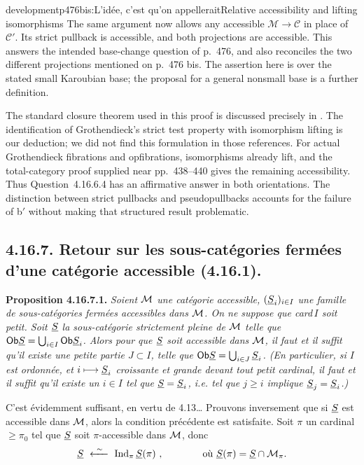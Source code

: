 \begin{dcomment}{development}{p476bis:L'idée, c'est qu'on appellerait}{Relative accessibility and lifting isomorphisms}
The same argument now allows any accessible $\mathcal M\to\mathcal C$ in place of $\mathcal C'$. Its strict pullback is accessible, and both projections are accessible. This answers the intended base-change question of p.~476, and also reconciles the two different projections mentioned on p.~476 bis. The assertion here is over the stated small Karoubian base; the proposal for a general nonsmall base is a further definition.

The standard closure theorem used in this proof is discussed precisely in \citet[Examples~4.8 and Remark~4.9]{BourkeLack2024}. The identification of Grothendieck's strict test property with isomorphism lifting is our deduction; we did not find this formulation in those references. For actual Grothendieck fibrations and opfibrations, isomorphisms already lift, and the total-category proof supplied near pp.~438--440 gives the remaining accessibility. Thus Question~4.16.6.4 has an affirmative answer in both orientations. The distinction between strict pullbacks and pseudopullbacks accounts for the failure of b$'$ without making that structured result problematic.
\end{dcomment}


\subsection*{4.16.7. Retour sur les sous-catégories fermées d'une catégorie accessible (4.16.1).}

\textbf{Proposition 4.16.7.1.} \textit{Soient $\mathcal{M}$ une catégorie accessible, $(\underline{S}_i)_{i\in I}$ une famille de sous-catégories fermées accessibles dans $\mathcal{M}$. On ne suppose que \textup{card}\,$I$ soit petit. Soit $\underline{S}$ la sous-catégorie strictement pleine de $\mathcal{M}$ telle que $\mathsf{Ob} \underline{S} = \bigcup_{i\in I} \mathsf{Ob} \underline{S}_i$. Alors pour que $\underline{S}$ %
soit accessible dans $\mathcal{M}$, il faut et il suffit qu'il existe une \textup{petite} partie $J \subset I$, telle que $\mathsf{Ob} \underline{S} = \bigcup_{i\in J} \underline{S}_i$. (En particulier, si $I$ est ordonnée, et $i \longmapsto \underline{S}_i$ croissante et grande devant tout petit cardinal, il faut et il suffit qu'il existe un $i \in I$ tel que $\underline{S} = \underline{S}_i$, i.e. tel que $j \geqslant i$ implique $\underline{S}_j = \underline{S}_i$.)}

C'est évidemment suffisant, en vertu de 4.13\dots{} Prouvons inversement que si $\underline{S}$ est accessible dans $\mathcal{M}$, alors la condition précédente est satisfaite. Soit $\pi$ un cardinal $\geqslant \pi_0$ tel que $\underline{S}$ soit $\pi$-accessible dans $\mathcal{M}$, donc
\[
\uS \ \xleftarrow{\ \sim\ }\ \Ind_\pi \uS(\pi) \ , \qquad\qquad \text{où } \uS(\pi) = \uS \cap \cM_\pi.
\]

